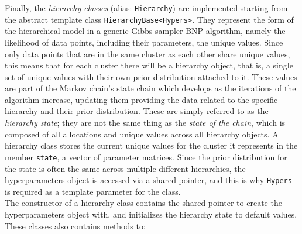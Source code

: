 Finally, the \emph{hierarchy classes} (alias: \verb|Hierarchy|) are implemented starting from the abstract template class \verb|HierarchyBase<Hypers>|.
They represent the form of the hierarchical model in a generic Gibbs sampler BNP algorithm, namely the likelihood of data points, including their parameters, the unique values.
Since only data points that are in the same cluster as each other share unique values, this means that for each cluster there will be a hierarchy object, that is, a single set of unique values with their own prior distribution attached to it.
These values are part of the Markov chain's state chain which develops as the iterations of the algorithm increase, updating them providing the data related to the specific hierarchy and their prior distribution.
These are simply referred to as the \emph{hierarchy state}; they are not the same thing as the \emph{state of the chain}, which is composed of all allocations and unique values across all hierarchy objects.
A hierarchy class stores the current unique values for the cluster it represents in the member \verb|state|, a vector of parameter matrices.
Since the prior distribution for the state is often the same across multiple different hierarchies, the hyperparameters object is accessed via a shared pointer, and this is why \verb|Hypers| is required as a template parameter for the class. \\
The constructor of a hierarchy class contains the shared pointer to create the hyperparameters object with, and initializes the hierarchy state to default values.
These classes also contains methods to:

